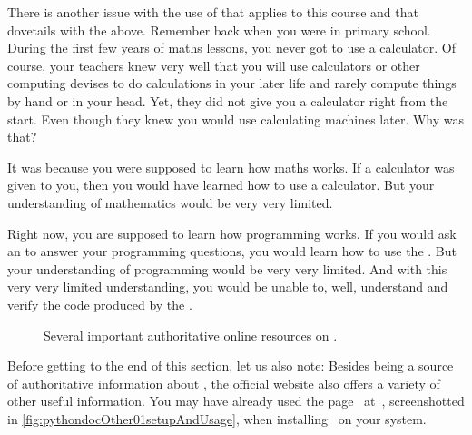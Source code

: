 There is another issue with the use of  that applies to this course and that dovetails with the above.
Remember back when you were in primary school.
During the first few years of maths lessons, you never got to use a calculator.
Of course, your teachers knew very well that you will use calculators or other computing devises to do calculations in your later life and rarely compute things by hand or in your head.
Yet, they did not give you a calculator right from the start.
Even though they knew you would use calculating machines later.
Why was that?

It was because you were supposed to learn how maths works.
If a calculator was given to you, then you would have learned how to use a calculator.
But your understanding of mathematics would be very very limited.

Right now, you are supposed to learn how programming works.
If you would ask an  to answer your programming questions, you would learn how to use the .
But your understanding of programming would be very very limited.
And with this very very limited understanding, you would be unable to, well, understand and verify the code produced by the .%
%
\FloatBarrier%
\endhsection%
%
%
%
\begin{figure}%
\centering%
%
%
%
\floatSep%
%
%
%
\floatRowSep%
%
%
%
\floatSep%
%
%
%
\caption{Several important authoritative online resources on \python.}%
\label{fig:pythondoc:D}%
\end{figure}%
%
Before getting to the end of this section, let us also note:
Besides being a source of authoritative information about \python, the official website  also offers a variety of other useful information.
You may have already used the  page~\cite{PSF:P3D:PSAU} at~, screenshotted in \cref{fig:pythondocOther01setupAndUsage}, when installing \python\ on your system.

